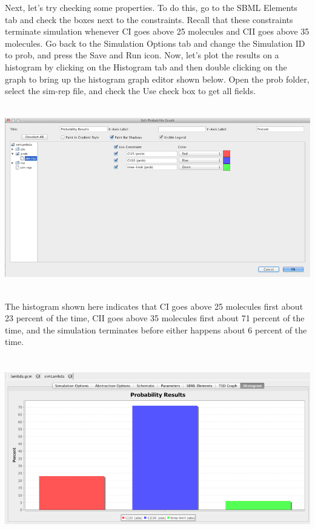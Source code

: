 \documentclass[titlepage,11pt]{article}
\begin{document}
Next, let's try checking some properties.  To do this, go to the SBML Elements tab and check the boxes next to the constraints.  Recall that these constraints terminate simulation whenever CI goes above 25 molecules and CII goes above 35 molecules.  Go back to the Simulation Options tab and change the Simulation ID to prob, and press the Save and Run icon.  Now, let's plot the results on a histogram by clicking on the Histogram tab and then double clicking on the graph to bring up the histogram graph editor shown below.  Open the prob folder, select the sim-rep file, and check the Use check box to get all fields.  

\begin{center}
\includegraphics[height=80mm]{screenshots/editProbGraph}
\end{center}

The histogram shown here indicates that CI goes above 25 molecules first about 23 percent of the time, CII goes above 35 molecules first about 71 percent of the time, and the simulation terminates before either happens about 6 percent of the time.

\begin{center} 
\includegraphics[height=80mm]{screenshots/probResults}
\end{center}
\end{document}
